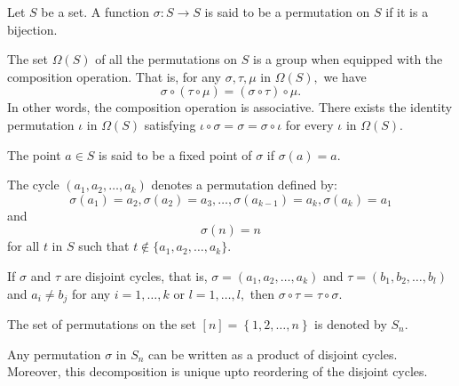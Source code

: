 

\begin{definition}[Permutation]
	Let $S$ be a set. A function $ \sigma \colon S \to S$ is said to be a
	permutation on $S$ if it is a bijection.
\end{definition}

The set $ \Omega (S) $ of all the permutations on $S$ is a group when equipped with the
composition operation.
That is, for any $\sigma, \tau, \mu$ in $ \Omega(S),$ we have
$$ \sigma \circ ( \tau \circ \mu) = (\sigma \circ \tau) \circ \mu.$$
In other words, the composition operation is associative.
There exists the identity permutation $ \iota $ in $ \Omega(S)$
satisfying $\iota \circ \sigma = \sigma = \sigma \circ \iota$
for every $\iota$ in $ \Omega(S).$

The point $a \in S$ is said to be a fixed point of $ \sigma $ if $ \sigma(a) = a.$

The cycle $(a_1, a_2, \dotsc, a_k)$ denotes a permutation defined by:
$$ \sigma(a_1) = a_2, \sigma(a_2) = a_3, \dotsc, \sigma(a _{k-1} ) = a_k, \sigma(a_k) = a_1$$
and 
$$ \sigma(n) = n$$
for all $t $ in $S$ such that $t \not \in \{a_1, a_2, \dotsc, a_k\}.$

If $\sigma$ and $ \tau$ are disjoint cycles, that is,
$ \sigma =  (a_1, a_2, \dotsc, a_k)$ and $\tau = (b_1, b_2, \dotsc, b_l) $
and $a_i \not = b_j$ for any $i = 1, \dotsc, k $ or $ l =1 ,\dotsc, l,$
then $ \sigma \circ \tau = \tau \circ \sigma.$

\begin{definition}[$S_n$]
	The set of permutations on the set $\left[ n \right] = \left\{ 1, 2, \dotsc, n \right\} $ is denoted by $S_n.$
\end{definition}

\begin{theorem}
	Any permutation $ \sigma $ in $S_n$ can be written as a product of disjoint cycles.
	Moreover, this decomposition is unique upto reordering of the disjoint cycles.
\end{theorem}

